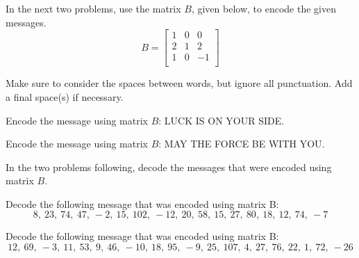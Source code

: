 In the next two problems, use the matrix $B$, given below, to encode the given messages.
\[
    B = \begin{bmatrix}
        1 & 0 & 0  \\
        2 & 1 & 2  \\
        1 & 0 & -1 \\
    \end{bmatrix}
\]

Make sure to consider the spaces between words, but ignore all punctuation. Add a final space(s) if
necessary.

\begin{puzzle}
    Encode the message using matrix $B$:
    LUCK IS ON YOUR SIDE.
\end{puzzle}


\begin{puzzle}
    Encode the message using matrix $B$:
    MAY THE FORCE BE WITH YOU.
\end{puzzle}

In the two problems following, decode the messages that were encoded using matrix $B$.

\begin{puzzle}
    Decode the following message that was encoded using matrix B:
    \[
        8,~ 23,~ 74,~ 47,~ -2,~ 15,~ 102,~ -12,~ 20,~ 58,~ 15,~ 27,~ 80,~ 18,~ 12,~ 74,~ -7
    \]
\end{puzzle}

\begin{puzzle}
    Decode the following message that was encoded using matrix B:
    \[
        12,~ 69,~ -3,~ 11,~ 53,~ 9,~ 46,~ -10,~ 18,~ 95,~ -9,~ 25,~ 107,~ 4,~ 27,~ 76,~ 22,~ 1,~ 72,~ -26
    \]
\end{puzzle}




